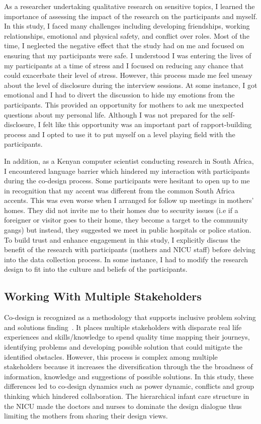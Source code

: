  As a researcher undertaking qualitative research on sensitive topics, I learned the importance of assessing the impact of the research on the participants and myself. In this study, I faced many challenges including developing friendships, working relationships, emotional and physical safety, and conflict over roles. Most of the time, I neglected the negative effect that the study had on me and focused on ensuring that my participants were safe. I understood I was entering the lives of my participants at a time of stress and I focused on reducing any chance that could exacerbate their level of stress. However, this process made me feel uneasy about the level of disclosure during the interview sessions. At some instance, I got emotional and I had to divert the discussion to hide my emotions from the participants. This provided an opportunity for mothers to ask me unexpected questions about my personal life. Although I was not prepared for the self-disclosure, I felt like this opportunity was an important part of rapport-building process and I opted to use it to put myself on a level playing field with the participants.
 
  In addition, as a Kenyan computer scientist conducting research in South Africa, I encountered language barrier which hindered my interaction with participants during the co-design process. Some participants were hesitant to open up to me in recognition that my accent was different from the common South Africa accents. This was even worse when I arranged for follow up meetings in mothers' homes. They did not invite me to their homes due to security issues (i.e if a foreigner or visitor goes to their home, they become a target to the community gangs) but instead, they suggested we meet in public hospitals or police station. To build trust and enhance engagement in this study, I explicitly discuss the benefit of the research with participants (mothers and NICU staff) before delving into the data collection process. In some instance, I had to modify the research design to fit into the culture and beliefs of the participants.
 
\subsection{Working With Multiple Stakeholders}
Co-design is recognized as a methodology that supports inclusive problem solving and solutions finding~\citep{Jones2008b}. It places multiple stakeholders with disparate real life experiences and skills/knowledge to spend quality time mapping their journeys, identifying problems and developing possible solution that could mitigate the identified obstacles. However, this process is complex among multiple stakeholders because it increases the diversification through the the broadness of information, knowledge and suggestions of possible solutions. In this study, these differences led to co-design dynamics such as power dynamic, conflicts and group thinking which hindered collaboration. The hierarchical infant care structure in the NICU made the doctors and nurses to dominate the design dialogue thus limiting the mothers from sharing their design views. 

